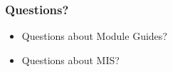 \documentclass[t,12pt,numbers,fleqn]{beamer}
\begin{document}

\begin{frame}
\frametitle{Questions?}
\begin{itemize}
\item Questions about Module Guides?
\item Questions about MIS?
\end{itemize}
\end{frame}


  






\end{document}
